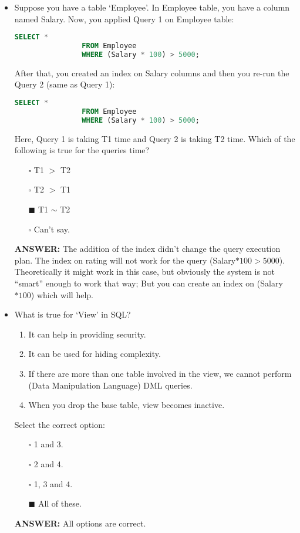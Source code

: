 \documentclass[10pt]{article}
\begin{document}
\begin{itemize}
		\item Suppose you have a table ‘Employee’. In Employee table, you have a column named Salary. Now, you applied Query 1 on Employee table:
			\begin{lstlisting}[language=SQL,firstline=1, lastline=3] 
				SELECT * 
				FROM Employee 
				WHERE (Salary * 100) > 5000;
			\end{lstlisting}
			After that, you created an index on Salary columns and then you re-run the Query 2 (same as Query 1):
			\begin{lstlisting}[language=SQL,firstline=1, lastline=3] 
				SELECT * 
				FROM Employee 
				WHERE (Salary * 100) > 5000;
			\end{lstlisting}
			Here, Query 1 is taking T1 time and Query 2 is taking T2 time. Which of the following is true for the queries time?
			\begin{enumerate}
				\item[$\square$] T1 $>$ T2
				\item[$\square$] T2 $>$ T1
				\item[$\blacksquare$] T1 $\sim$ T2
				\item[$\square$] Can’t say.
			\end{enumerate}
			\color{red} \textbf{ANSWER:} \color{black} The addition of the index didn’t change the query execution plan.  The index on rating will not work for the query (Salary$* 100 > 5000$). Theoretically it might work in this case, but obviously the system is not “smart” enough to work that way; But you can create an index on (Salary$ * 100$) which will help.
			
		\newpage

		\item What is true for ‘View’ in SQL?
			\begin{enumerate}
				\item It can help in providing security.
				\item It can be used for hiding complexity.
				\item If there are more than one table involved in the view, we cannot perform (Data Manipulation Language) DML queries.
				\item When you drop the base table, view becomes inactive.
			\end{enumerate}
			Select the correct option:
			\begin{enumerate}
				\item[$\square$] 1 and 3.
				\item[$\square$] 2 and 4.
				\item[$\square$] 1, 3 and 4.
				\item[$\blacksquare$] All of these.
			\end{enumerate}
			\color{red} \textbf{ANSWER:} \color{black} All options are correct.


\end{itemize}
\end{document}
